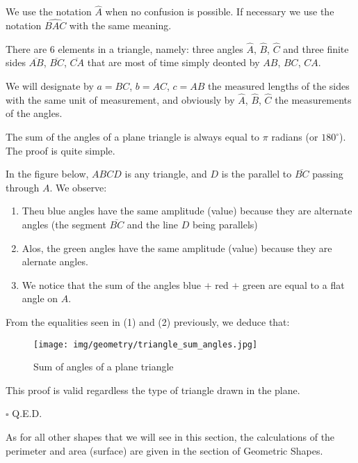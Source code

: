 	\begin{tcolorbox}[title=Remark,colframe=black,arc=10pt]
	We use the notation $\hat{A}$ when no confusion is possible. If necessary we use the notation $\widehat{BAC}$ with the same meaning.
	\end{tcolorbox}
	There are $6$ elements in a triangle, namely: three angles $\hat{A}$,  $\hat{B}$,  $\hat{C}$ and three finite sides $\overline{AB}$, $\overline{BC}$, $\overline{CA}$ that are most of time simply deonted by $AB$, $BC$, $CA$.

	We will designate by $a=BC$, $b=AC$, $c=AB$ the measured lengths of the sides with the same unit of measurement, and obviously by $\hat{A}$,  $\hat{B}$,  $\hat{C}$ the measurements of the angles.

	\begin{theorem}
	The sum of the angles of a plane triangle is always equal to $\pi$ radians (or $180^\circ$). The proof is quite simple.
	\end{theorem}
	\begin{dem}
	In the figure below, $ABCD$ is any triangle, and $D$ is the parallel to $\overline{BC}$ passing through $A$. We observe:
	\begin{enumerate}
		\item Theu blue angles have the same amplitude (value) because they are alternate angles (the segment $\overline{BC}$ and the line $D$ being parallels)

		\item Alos, the green angles have the same amplitude (value) because they are alernate angles.

		\item We notice that the sum of the angles blue $+$ red $+$ green are equal to a flat angle on $A$.
	\end{enumerate}
	From the equalities seen in (1) and (2) previously, we deduce that:
	
	\begin{figure}[H]
		\centering
		\texttt{[image: img/geometry/triangle\_sum\_angles.jpg]}
		\caption{Sum of angles of a plane triangle}
	\end{figure}
	This proof is valid regardless the type of triangle drawn in the plane.
	\begin{flushright}
		$\square$  Q.E.D.
	\end{flushright}
	\end{dem}
	As for all other shapes that we will see in this section, the calculations of the perimeter and area (surface) are given in the section of Geometric Shapes.
	
